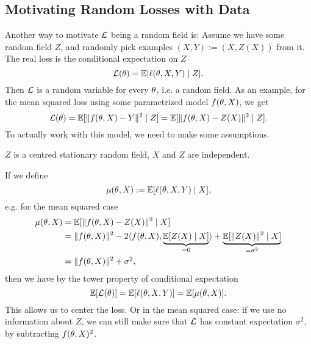 \subsection{Motivating Random Losses with Data}

Another way to motivate \(\mathcal{L}\) being a random field is: Assume we have some
random field \(Z\), and randomly pick examples
\((X,Y) := (X,Z(X))\) from it. The real loss is the conditional expectation on
\(Z\)
\begin{equation*}
	\mathcal{L}(\theta) = \mathbb{E}[\ell(\theta, X,Y)\mid Z].
\end{equation*}
Then \(\mathcal{L}\) is a random variable for every \(\theta\), i.e. a random field.
As an example, for the mean squared loss using some parametrized model
\(f(\theta, X)\), we get
\begin{equation*}
	\mathcal{L}(\theta)
	= \mathbb{E}[\|f(\theta, X) - Y\|^2 \mid Z]
	= \mathbb{E}[\|f(\theta, X) - Z(X)\|^2 \mid Z].
\end{equation*}
To actually work with this model, we need to make some assumptions.

\begin{axiom}
	\(Z\) is a centred stationary random field, \(X\) and \(Z\) are independent.
\end{axiom}

If we define
\begin{equation*}
	\mu(\theta, X):= \mathbb{E}[\ell(\theta, X,Y)\mid X],
\end{equation*}
e.g. for the mean squared case
\begin{align*}
	\mu(\theta, X)&= \mathbb{E}[\|f(\theta, X)-Z(X)\|^2 \mid X]\\
	&= \|f(\theta, X)\|^2 - 2\langle f(\theta, X), \underbrace{\mathbb{E}[Z(X)\mid X]}_{=0}\rangle
	+ \underbrace{\mathbb{E}[\|Z(X)\|^2\mid X]}_{=\sigma^2}\\
	&= \|f(\theta, X)\|^2 + \sigma^2,
\end{align*}
then we have by the tower property of conditional expectation
\begin{equation*}
	\mathbb{E}[\mathcal{L}(\theta)]
	= \mathbb{E}[\ell(\theta, X,Y)]
	= \mathbb{E}[\mu(\theta, X)].
\end{equation*}
This allows us to center the loss. Or in the mean squared case: if we use no
information about \(Z\), we can still make sure that \(\mathcal{L}\) has constant
expectation \(\sigma^2\), by subtracting \(f(\theta, X)^2\).


